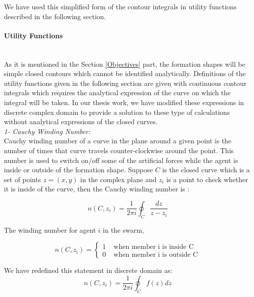 We have used this simplified form of the contour integrals in utility functions described in the following section. 		
		
\paragraph{Utility Functions}\hspace{0pt} \\
As it is mentioned in the Section \ref{Objectives} part, the formation shapes will be simple closed contours which cannot be identified analytically. Definitions of the utility functions given in the following section are given with continuous contour integrals which requires the analytical expression of the curve on which the integral will be taken. In our thesis work, we have modified these expressions in discrete complex domain to provide a solution to  these type of calculations without analytical expressions of the closed curves.\\

\textit{ 		1- Cauchy Winding Number:} \\ 
Cauchy winding number of a curve in the plane around a given point is the number of times that curve travels counter-clockwise around the point. This number is used to switch on/off some of the artificial forces while the agent is inside or outside of the formation shape. Suppose $C$ is the closed curve which is a set of points $z=(x,y)$ in the complex plane  and $z_i$ is a point to check whether it is inside of the curve, then the Cauchy winding number is \cite{17} :
					
\begin{equation}
 n(C,z_i) = \frac{1}{2\pi i}\oint_C \frac{dz}{z-z_i}
\end{equation}
		
The winding number for agent $i$ in the swarm,

\begin{equation}
n(C,z_i) = \left\{ \begin{array}{rl}
1 &\mbox{ when member i is inside C} \\
0 &\mbox{ when member i is outside C}
\end{array} \right.
\end{equation}

We have redefined this statement in discrete domain as:
\begin{equation}
n(C,z_i) = \frac{1}{2\pi i} \oint_C f(z)dz
\end{equation}

